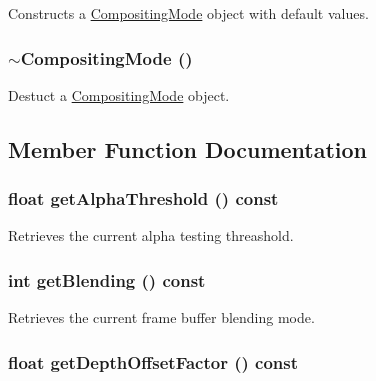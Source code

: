 Constructs a \hyperlink{classm3g_1_1CompositingMode}{CompositingMode} object with default values. \hypertarget{classm3g_1_1CompositingMode_0bba5b15be7249e946c9aaf94631ce3b}{
\subsubsection[{$\sim$CompositingMode}]{\setlength{\rightskip}{0pt plus 5cm}$\sim${\bf CompositingMode} ()}}
\label{classm3g_1_1CompositingMode_0bba5b15be7249e946c9aaf94631ce3b}


Destuct a \hyperlink{classm3g_1_1CompositingMode}{CompositingMode} object. 

\subsection{Member Function Documentation}
\hypertarget{classm3g_1_1CompositingMode_19ab71363ea77fa86aa6fafce87f06cb}{
\subsubsection[{getAlphaThreshold}]{\setlength{\rightskip}{0pt plus 5cm}float getAlphaThreshold () const}}
\label{classm3g_1_1CompositingMode_19ab71363ea77fa86aa6fafce87f06cb}


Retrieves the current alpha testing threashold. \hypertarget{classm3g_1_1CompositingMode_078954de3d786bd11dc98b06f237bbbb}{
\subsubsection[{getBlending}]{\setlength{\rightskip}{0pt plus 5cm}int getBlending () const}}
\label{classm3g_1_1CompositingMode_078954de3d786bd11dc98b06f237bbbb}


Retrieves the current frame buffer blending mode. \hypertarget{classm3g_1_1CompositingMode_d24a4116e72678164f31d7a48f74be6b}{
\subsubsection[{getDepthOffsetFactor}]{\setlength{\rightskip}{0pt plus 5cm}float getDepthOffsetFactor () const}}
\label{classm3g_1_1CompositingMode_d24a4116e72678164f31d7a48f74be6b}


